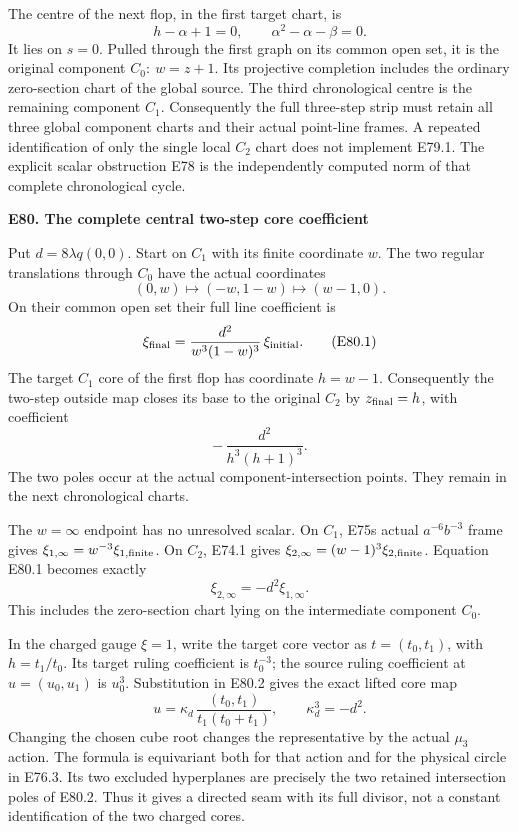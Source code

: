 The centre of the next flop, in the first target chart, is
\[
 h-\alpha+1=0,\qquad \alpha^2-\alpha-\beta=0.
 \tag{E79.2}
\]
It lies on \(s=0\). Pulled through the first graph on its
common open set, it is the original component
\(C_0:\ w=z+1\). Its projective completion includes the
ordinary zero-section chart of the global source.
The third chronological centre is the remaining component
\(C_1\). Consequently the full three-step strip must
retain all three global component charts and their actual
point-line frames. A repeated identification of only the
single local \(C_2\) chart does not implement E79.1.
The explicit scalar obstruction E78 is the independently
computed norm of that complete chronological cycle.

\par

\medskip\noindent\textbf{E80. The complete central two-step core coefficient}

\par\nobreak

Put \(d=8\lambda q(0,0)\). Start on \(C_1\) with its
finite coordinate \(w\). The two regular translations
through \(C_0\) have the actual coordinates
\[
 (0,w)\longmapsto(-w,1-w)
            \longmapsto(w-1,0).
\]
On their common open set their full line coefficient is
\[
 \xi_{\rm final}
       =\frac{d^2}{w^3(1-w)^3}\,\xi_{\rm initial}.
 \tag{E80.1}
\]
The target \(C_1\) core of the first flop has coordinate
\(h=w-1\). Consequently the two-step outside map closes
its base to the original \(C_2\) by \(z_{\rm final}=h\),
with coefficient
\[
                   -\,\frac{d^2}{h^3(h+1)^3}.  \tag{E80.2}
\]
The two poles occur at the actual component-intersection
points. They remain in the next chronological charts.

The \(w=\infty\) endpoint has no unresolved scalar.
On \(C_1\), E75\textquotesingle s actual \(a^{-6}b^{-3}\) frame gives
\(\xi_{1,\infty}=w^{-3}\xi_{1,\rm finite}\).
On \(C_2\), E74.1 gives
\(\xi_{2,\infty}=(w-1)^3\xi_{2,\rm finite}\).
Equation E80.1 becomes exactly
\[
                      \xi_{2,\infty}
                             =-d^2\xi_{1,\infty}.              \tag{E80.3}
\]
This includes the zero-section chart lying on the
intermediate component \(C_0\).

In the charged gauge \(\xi=1\), write the target core
vector as \(t=(t_0,t_1)\), with \(h=t_1/t_0\).
Its target ruling coefficient is \(t_0^{-3}\); the
source ruling coefficient at \(u=(u_0,u_1)\) is \(u_0^3\).
Substitution in E80.2 gives the exact lifted core map
\[
 u=\kappa_d\,\frac{(t_0,t_1)}{t_1(t_0+t_1)},
              \qquad \kappa_d^3=-d^2.           \tag{E80.4}
\]
Changing the chosen cube root changes the representative
by the actual \(\mu_3\) action. The formula is equivariant
both for that action and for the physical circle in
E76.3. Its two excluded hyperplanes are precisely the
two retained intersection poles of E80.2. Thus it gives
a directed seam with its full divisor, not a constant
identification of the two charged cores.

